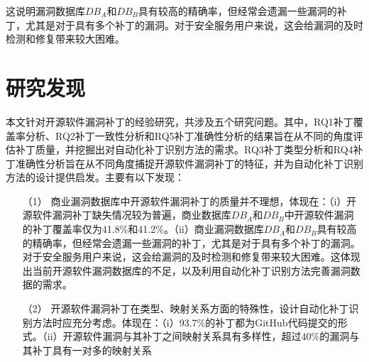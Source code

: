这说明漏洞数据库$DB_A$和$DB_B$具有较高的精确率，但经常会遗漏一些漏洞的补丁，尤其是对于具有多个补丁的漏洞。对于安全服务用户来说，这会给漏洞的及时检测和修复带来较大困难。%

\section{研究发现}
本文针对开源软件漏洞补丁的经验研究，共涉及五个研究问题。其中，RQ1补丁覆盖率分析、RQ2补丁一致性分析和RQ5补丁准确性分析的结果旨在从不同的角度评估补丁质量，并挖掘出对自动化补丁识别方法的需求。RQ3补丁类型分析和RQ4补丁准确性分析旨在从不同角度捕捉开源软件漏洞补丁的特征，并为自动化补丁识别方法的设计提供启发。主要有以下发现：

\begin{enumerate}
    \item [（1）] 商业漏洞数据库中开源软件漏洞补丁的质量并不理想，体现在：（i）开源软件漏洞补丁缺失情况较为普遍，商业数据库$DB_A$和$DB_B$中开源软件漏洞的补丁覆盖率仅为41.8\%和41.2\%。（ii）商业漏洞数据库$DB_A$和$DB_B$具有较高的精确率，但经常会遗漏一些漏洞的补丁，尤其是对于具有多个补丁的漏洞。对于安全服务用户来说，这会给漏洞的及时检测和修复带来较大困难。这体现出当前开源软件漏洞数据库的不足，以及利用自动化补丁识别方法完善漏洞数据的需求。
    \item [（2）]开源软件漏洞补丁在类型、映射关系方面的特殊性，设计自动化补丁识别方法时应充分考虑。体现在：（i）93.7\%的补丁都为GitHub代码提交的形式。（ii）开源软件漏洞与其补丁之间映射关系具有多样性，超过40\%的漏洞与其补丁具有一对多的映射关系
\end{enumerate}

